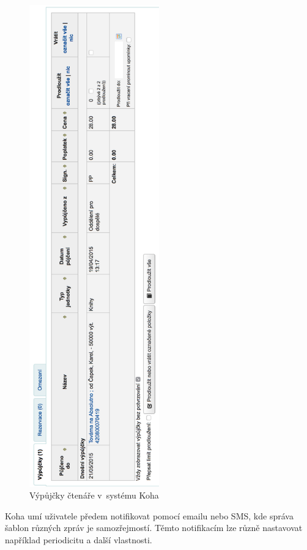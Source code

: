 \documentclass[
	11pt, oneside, printed, final, palatino, monochrome
	microtype,
	table,   %
	lof,     %
	lot     %
]{fithesis3}
\begin{document}
{\begin{figure}
    \centering
    \includegraphics[width=0.5\textwidth]{resources/vypujcky_left}
    \caption{Výpůjčky čtenáře v~systému Koha}
    \label{vypujcky}
\end{figure}

Koha umí uživatele předem notifikovat pomocí emailu nebo SMS, kde správa šablon různých zpráv je samozřejmostí. Těmto notifikacím lze různě nastavovat například periodicitu a další vlastnosti.

}
\end{document}
